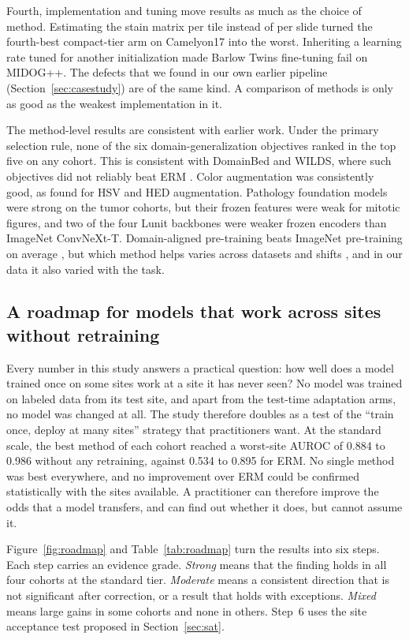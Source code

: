Fourth, implementation and tuning move results as much as the choice of
method. Estimating the stain matrix per tile instead of per slide turned the
fourth-best compact-tier arm on Camelyon17 into the worst. Inheriting a learning rate tuned
for another initialization made Barlow Twins fine-tuning fail on MIDOG++. The
defects that we found in our own earlier pipeline (Section~\ref{sec:casestudy})
are of the same kind. A comparison of methods is only as good as the weakest
implementation in it.

The method-level results are consistent with earlier work. Under the primary selection rule, none of the six
domain-generalization objectives ranked in the top five on any cohort. This is
consistent with DomainBed and WILDS, where such objectives did not reliably
beat ERM \citep{gulrajani2021domainbed,koh2021wilds}. Color
augmentation was consistently good, as \citet{tellez2019stain} found for HSV
and HED augmentation. Pathology foundation models were strong on the tumor
cohorts, but their frozen features were weak for mitotic figures, and two of
the four Lunit backbones were weaker frozen encoders than ImageNet ConvNeXt-T.
Domain-aligned pre-training beats ImageNet pre-training on average
\citep{kang2023benchmarking}, but which method helps varies across datasets and
shifts \citep{wiles2022fine}, and in our data it also varied with the task.

\subsection{A roadmap for models that work across sites without retraining}
\label{sec:roadmap}

Every number in this study answers a practical question: how well does a
model trained once on some sites work at a site it has never seen? No model
was trained on labeled data from its test site, and apart from the test-time
adaptation arms, no model was changed at all. The study therefore
doubles as a test of the ``train once, deploy at many sites'' strategy that
practitioners want. At the standard scale, the best method of each cohort
reached a worst-site AUROC of 0.884 to 0.986 without any retraining, against
0.534 to 0.895 for ERM. No single method was best everywhere, and no
improvement over ERM could be confirmed statistically with the sites
available. A practitioner can therefore improve the odds that a model
transfers, and can find out whether it does, but cannot assume it.

Figure~\ref{fig:roadmap} and Table~\ref{tab:roadmap} turn the results into six
steps. Each step carries an evidence grade. \emph{Strong} means that the
finding holds in all four cohorts at the standard tier. \emph{Moderate} means a
consistent direction that is not significant after correction, or a result
that holds with exceptions. \emph{Mixed}
means large gains in some cohorts and none in others. Step~6 uses the site acceptance test proposed in
Section~\ref{sec:sat}.

